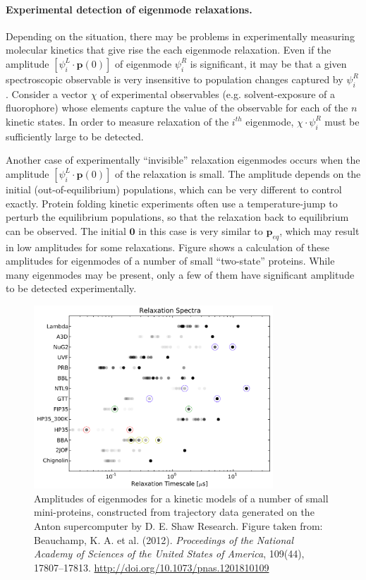 \documentclass[11pt, oneside]{article}   	%
\begin{document}
\paragraph{Experimental detection of eigenmode relaxations.} Depending on the situation, there may be problems in experimentally measuring molecular kinetics that give rise the each eigenmode relaxation.  Even if the amplitude $[\psi^L_i \cdot  \mathbf{p}(0)]$ of eigenmode $\psi_i^R$ is significant, it may be that a given spectroscopic observable is very insensitive to population changes captured by $\psi_i^R$.  Consider a vector $\chi$ of experimental observables (e.g. solvent-exposure of a fluorophore) whose elements capture the value of the observable for each of the $n$ kinetic states.  In order to measure relaxation of the $i^{th}$ eigenmode, $\chi \cdot \psi_i^R$ must be sufficiently large to be detected.   

Another case of experimentally ``invisible'' relaxation eigenmodes occurs when the amplitude $[\psi^L_i \cdot  \mathbf{p}(0)]$ of the relaxation is small.   The amplitude depends on the initial (out-of-equilibrium) populations, which can be very different to control exactly.   Protein folding kinetic experiments often use a temperature-jump to perturb the equilibrium populations, so that the relaxation back to equilibrium can be observed.  The initial $\mathbf{0}$ in this case is very similar to $\mathbf{p}_{eq}$, which may result in low amplitudes for some relaxations.  Figure \label{fig:beauchamp} shows a calculation of these amplitudes for eigenmodes of a number of small ``two-state'' proteins.  While many eigenmodes may be present, only a few of them have significant amplitude to be detected experimentally.


\begin{figure}[htbp]
\includegraphics[width=0.8\textwidth]{beauchamp}
\caption{\label{fig:beauchamp} Amplitudes of eigenmodes for a kinetic models of a number of small mini-proteins, constructed from  trajectory data generated on the Anton supercomputer by D. E. Shaw Research.  Figure taken from:  Beauchamp, K. A. et al. (2012). \textit{Proceedings of the National Academy of Sciences of the United States of America}, 109(44), 17807--17813. \url{http://doi.org/10.1073/pnas.1201810109}   }
\end{figure}
\end{document}
